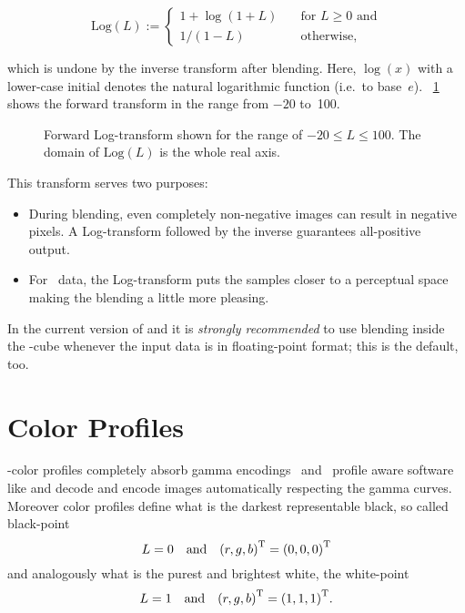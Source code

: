 \begin{equation}\label{equ:log-transform}
  \mbox{Log}(L) :=
  \left\{
  \begin{array}{ll}
    1 + \log(1 + L) & \quad \mbox{for } L \geq 0 \mbox{ and} \\
    1 / (1 - L)     & \quad \mbox{otherwise,}
  \end{array}
  \right.
\end{equation}

\noindent which is undone by the inverse transform after blending.  Here, $\log(x)$ with a
lower-case initial denotes the natural logarithmic function (i.e.\ to base~$e$).
\figureName~\ref{fig:log-transform} shows the forward transform in the range from $-20$ to~100.

\begin{figure}[htbp]
  \centering

  \caption[Log-transform]{\label{fig:log-transform}Forward Log-transform shown for the range of
    $-20 \leq L \leq 100$.  The domain of $\mbox{Log}(L)$ is the whole real axis.}

\end{figure}

This transform serves two purposes:

\begin{itemize}
\item
  During blending, even completely non-negative images can result in negative pixels.  A
  Log-transform followed by the inverse guarantees all-positive output.

\item
  For ~data, the Log-transform puts the samples closer to a perceptual space making
  the blending a little more pleasing.
\end{itemize}

In the current version of  and  it is \emph{strongly
  recommended} to use blending inside the -cube whenever the input data is in
floating-point format; this is the default, too.


\section[Color Profiles]{\label{sec:color-profiles}%
  Color Profiles}

-color profiles completely absorb gamma
encodings~ and ~profile aware software like
 and  decode and encode images automatically respecting
the gamma curves.  Moreover color profiles define what is the darkest representable black, so
called black-point
\[
  L = 0
  \quad \mbox{and}\quad
  {(r, g, b)}^{\mathrm{T}} = {(0, 0, 0)}^{\mathrm{T}}
\]
and analogously what is the purest and brightest white, the white-point
\[
  L = 1
  \quad \mbox{and}\quad
  {(r, g, b)}^{\mathrm{T}} = {(1, 1, 1)}^{\mathrm{T}}.
\]



